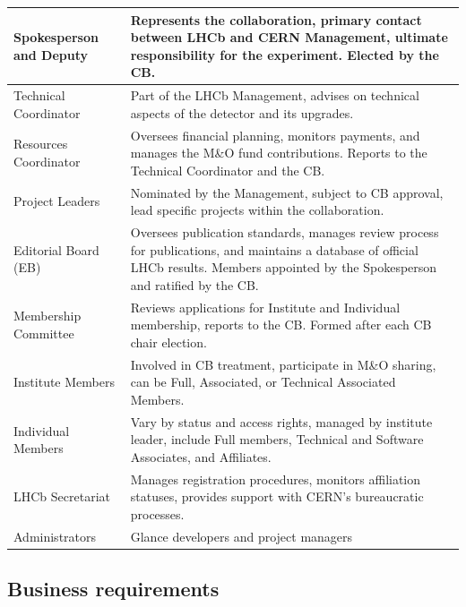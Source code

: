 \begin{longtable}{|p{}|p{}|}
Spokesperson and Deputy & Represents the collaboration, primary contact between LHCb and CERN Management, ultimate responsibility for the experiment. Elected by the CB. \\
\hline
Technical Coordinator & Part of the LHCb Management, advises on technical aspects of the detector and its upgrades. \\
\hline
Resources Coordinator & Oversees financial planning, monitors payments, and manages the M\&O fund contributions. Reports to the Technical Coordinator and the CB. \\
\hline
Project Leaders & Nominated by the Management, subject to CB approval, lead specific projects within the collaboration. \\
\hline
Editorial Board (EB) & Oversees publication standards, manages review process for publications, and maintains a database of official LHCb results. Members appointed by the Spokesperson and ratified by the CB. \\
\hline
Membership Committee & Reviews applications for Institute and Individual membership, reports to the CB. Formed after each CB chair election. \\
\hline
Institute Members & Involved in CB treatment, participate in M\&O sharing, can be Full, Associated, or Technical Associated Members. \\
\hline
Individual Members & Vary by status and access rights, managed by institute leader, include Full members, Technical and Software Associates, and Affiliates. \\
\hline
LHCb Secretariat & Manages registration procedures, monitors affiliation statuses, provides support with CERN’s bureaucratic processes. \\
\hline
Administrators & Glance developers and project managers \\
\hline
\end{longtable}




\subsection{Business requirements}
